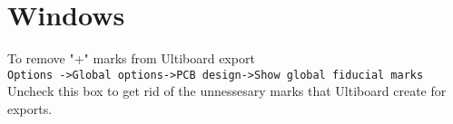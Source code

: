 \section{Windows}%
\label{sec:windows}


To remove "+" marks from Ultiboard export\\
\verb|Options ->Global options->PCB design->Show global fiducial marks|\\
Uncheck this box to get rid of the unnessesary marks that Ultiboard create for exports.

